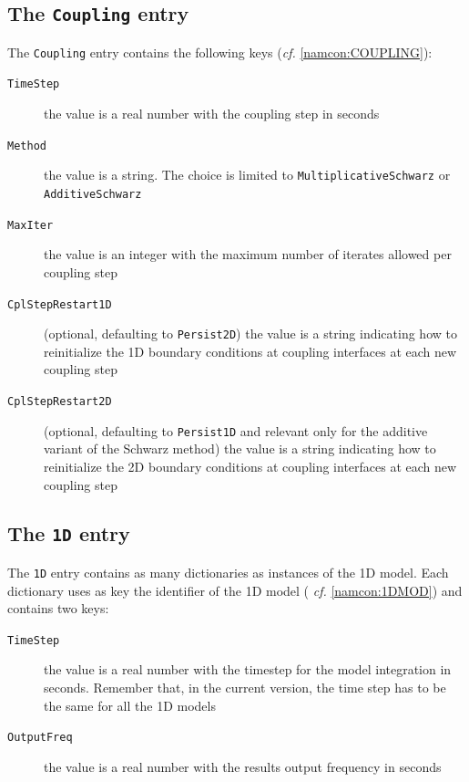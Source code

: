 \subsection{The \texttt{Coupling} entry}
The \texttt{Coupling} entry contains the following keys ({\em cf.} \ref{namcon:COUPLING}):
\begin{description}
  \item[\texttt{TimeStep}] the value is a real number with the
    coupling step in seconds
  \item[\texttt{Method}] the value is a string. The choice is limited to
    \texttt{MultiplicativeSchwarz} or\\
    \texttt{AdditiveSchwarz}
  \item[\texttt{MaxIter}] the value is an integer with the maximum
    number of iterates allowed per coupling step
  \item[\texttt{CplStepRestart1D}] (optional, defaulting to
    \texttt{Persist2D}) the value is a string indicating how to
    reinitialize the 1D boundary conditions at coupling interfaces at
    each new coupling step
  \item[\texttt{CplStepRestart2D}] (optional, defaulting to
    \texttt{Persist1D} and relevant only for the additive variant of
    the Schwarz method) the value is a string indicating how to
    reinitialize the 2D boundary conditions at coupling interfaces at
    each new coupling step
\end{description}

\subsection{The \texttt{1D} entry}
The \texttt{1D} entry contains as many dictionaries as instances of the 1D
model. Each dictionary uses as key the identifier of the 1D model ({\em
  cf.} \ref{namcon:1DMOD}) and contains two keys:
\begin{description}
  \item[\texttt{TimeStep}] the value is a real number with the
    timestep for the model integration in seconds. Remember that, in the
    current version, the time step has to be the same for all the 1D
    models
  \item[\texttt{OutputFreq}] the value is a real number with the
    results output frequency in seconds
\end{description}

